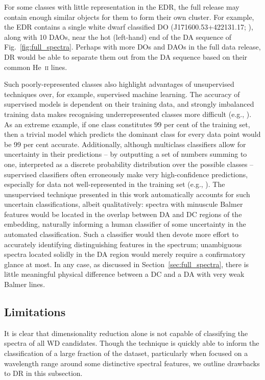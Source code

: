 \documentclass[fleqn,usenatbib]{mnras}
\begin{document}
For some classes with little representation in the EDR, the full release may contain enough similar objects for them to form their own cluster.
For example, the EDR contains a single white dwarf classified DO (J171600.53+422131.17; \citealt{manser24}), along with 10 DAOs, near the hot (left-hand) end of the DA sequence of Fig.~\ref{fig:full_spectra}.
Perhaps with more DOs and DAOs in the full data release, DR would be able to separate them out from the DA sequence based on their common He~\textsc{ii} lines.

Such poorly-represented classes also highlight advantages of unsupervised techniques over, for example, supervised machine learning.
The accuracy of supervised models is dependent on their training data, and strongly imbalanced training data makes recognising underrepresented classes more difficult (e.g., \citealt{he09, johnson19, das23}).
As an extreme example, if one class constitutes 99 per cent of the training set, then a trivial model which predicts the dominant class for every data point would be 99 per cent accurate.
Additionally, although multiclass classifiers allow for uncertainty in their predictions -- by outputting a set of numbers summing to one, interpreted as a discrete probability distribution over the possible classes -- supervised classifiers often erroneously make very high-confidence predictions, especially for data not well-represented in the training set (e.g., \citealt{nguyen15, guo17, hein19}).
The unsupervised technique presented in this work automatically accounts for such uncertain classifications, albeit qualitatively: spectra with minuscule Balmer features would be located in the overlap between DA and DC regions of the embedding, naturally informing a human classifier of some uncertainty in the automated classification.
Such a classifier would then devote more effort to accurately identifying distinguishing features in the spectrum; unambiguous spectra located solidly in the DA region would merely require a confirmatory glance at most.
In any case, as discussed in Section~\ref{sec:full_spectra}, there is little meaningful physical difference between a DC and a DA with very weak Balmer lines.

\subsection{Limitations}

It is clear that dimensionality reduction alone is not capable of classifying the spectra of all WD candidates.
Though the technique is quickly able to inform the classification of a large fraction of the dataset, particularly when focused on a wavelength range around some distinctive spectral features, we outline drawbacks to DR in this subsection.
\end{document}
